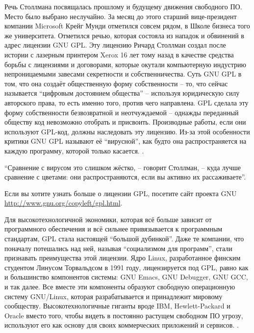 Речь Столлмана посвящалась прошлому и будущему движения свободного ПО. Место было выбрано неслучайно. За месяц до этого старший вице-президент компании Microsoft Крейг Мунди отметился совсем рядом, в Школе бизнеса того же университета. Отметился речью, которая состояла из нападок и обвинений в адрес лицензии GNU GPL. Эту лицензию Ричард Столлман создал после истории с лазерным принтером Xerox 16 лет тому назад в качестве средства борьбы с лицензиями и договорами, которые окутали компьютерную индустрию непроницаемыми завесами секретности и собственничества. Суть GNU GPL в том, что она создаёт общественную форму собственности -- то, что сейчас называется ``цифровым достоянием общества'' -- используя юридическую силу авторского права, то есть именно того, против чего направлена. GPL сделала эту форму собственности безвозвратной и неотчуждаемой -- однажды переданный обществу код невозможно отобрать и присвоить. Производные работы, если они используют GPL-код, должны наследовать эту лицензию. Из-за этой особенности критики GNU GPL называют её ``вирусной'', как будто она распространяется на каждую программу, которой только касается. .

``Сравнение с вирусом это слишком жёстко, -- говорит Столлман, -- куда лучше сравнение с цветами: они распространяются, если вы активно их рассаживаете''.

Если вы хотите узнать больше о лицензии GPL, посетите сайт проекта GNU \url{http://www.gnu.org/copyleft/gpl.html}.

Для высокотехнологичной экономики, которая всё больше зависит от программного обеспечения и всё сильнее привязывается к программным стандартам, GPL стала настоящей ``большой дубинкой''. Даже те компании, что поначалу потешались над ней, называя ``социализмом для программ'', стали признавать преимущества этой лицензии. Ядро Linux, разработанное финским студентом Линусом Торвальдсом в 1991 году, лицензируется под GPL, равно как и большинство компонентов системы: GNU Emacs, GNU Debugger, GNU GCC, и так далее. Все вместе эти компоненты образуют свободную операционную систему GNU/Linux, которая разрабатывается и принадлежит мировому сообществу. Высокотехнологичные гиганты вроде IBM, Hewlett-Packard и Oracle вместо того, чтобы видеть в постоянно растущем свободном ПО угрозу, используют его как основу для своих коммерческих приложений и сервисов. .

